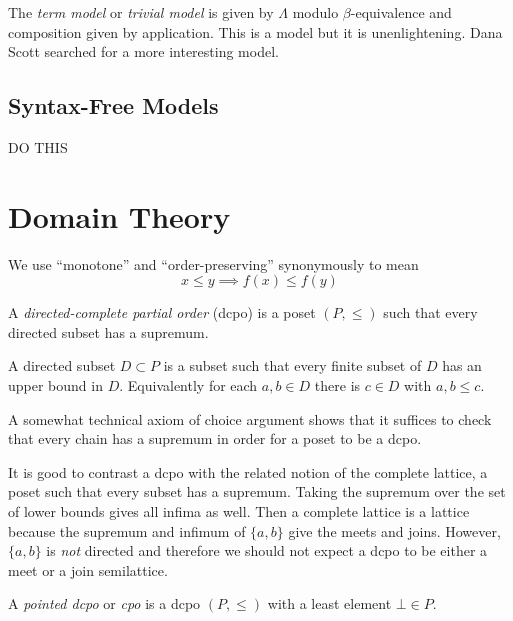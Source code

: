 \documentclass[12pt]{article}
\begin{document}
\begin{rmk}
The \textit{term model} or \textit{trivial model} is given by $\Lambda$ modulo $\beta$-equivalence and composition given by application. This is a model but it is unenlightening. Dana Scott searched for a more interesting model. 
\end{rmk}

\subsection{Syntax-Free Models}

DO THIS

\section{Domain Theory}

\begin{rmk}
We use ``monotone'' and ``order-preserving'' synonymously to mean
\[ x \le y \implies f(x) \le f(y) \]
\end{rmk}


\begin{defn}
A \textit{directed-complete partial order} (dcpo) is a poset $(P, \le)$ such that every directed subset has a supremum. 
\end{defn}

\begin{rmk}
A directed subset $D \subset P$ is a subset such that every finite subset of $D$ has an upper bound in $D$. Equivalently for each $a, b \in D$ there is $c \in D$ with $a,b \le c$. 
\end{rmk}

\begin{rmk}
A somewhat technical axiom of choice argument shows that it suffices to check that every chain has a supremum in order for a poset to be a dcpo. 
\end{rmk}

\begin{rmk}
It is good to contrast a dcpo with the related notion of the complete lattice, a poset such that every subset has a supremum. Taking the supremum over the set of lower bounds gives all infima as well. Then a complete lattice is a lattice because the supremum and infimum of $\{ a, b \}$ give the meets and joins. However, $\{ a, b \}$ is \textit{not} directed and therefore we should not expect a dcpo to be either a meet or a join semilattice.  
\end{rmk}

\begin{defn}
A \textit{pointed dcpo} or \textit{cpo} is a dcpo $(P, \le)$ with a least element $\bot \in P$.
\end{defn}
\end{document}
